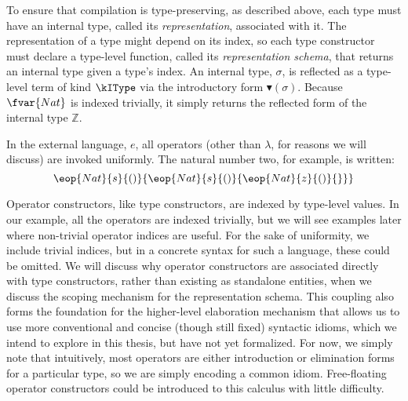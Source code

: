 To ensure that compilation is type-preserving, as described above, each type must have an internal type, called its \emph{representation}, associated with it. The representation of a type might depend on its index, so each type constructor must declare a type-level function, called its \emph{representation schema}, that returns an internal type given a type's index. An internal type, $\sigma$, is reflected as a type-level term of kind $\kIType$ via the introductory form $\blacktriangledown(\sigma)$. Because $\fvar{Nat}$ is indexed trivially, it simply returns the reflected form of the internal type $\mathbb{Z}$. %


In the external language, $e$, all operators (other than $\lambda$, for reasons we will discuss) are invoked uniformly. The natural number two, for example, is written: $$\eop{Nat}{s}{()}{\eop{Nat}{s}{()}{\eop{Nat}{z}{()}{ }}}$$

Operator constructors, like type constructors, are indexed by type-level values. In our example, all the operators are indexed trivially, but we will see examples later where non-trivial operator indices are useful. For the sake of uniformity, we include trivial indices, but in a concrete syntax for such a language, these could be omitted. We will discuss why operator constructors are associated directly with type constructors, rather than existing as standalone entities, when we discuss the scoping mechanism for the representation schema. This coupling also forms the foundation for the higher-level elaboration mechanism that allows us to use more conventional and concise (though still fixed) syntactic idioms, which we intend to explore in this thesis, but have not yet formalized. For now, we simply note that intuitively, most operators are either introduction or elimination forms for a particular type, so we are simply encoding a common idiom. Free-floating operator constructors could be introduced to this calculus with little difficulty.


